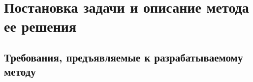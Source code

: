 \chapter{Постановка задачи и описание метода ее решения}
\label{chapter2}

\section{Требования, предъявляемые к разрабатываемому методу}
\label{reqs}
